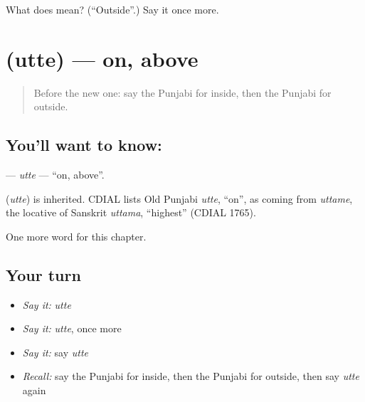 \begin{tcolorbox}[breakable,colback=teal!4,colframe=teal!35!black,title={Before you move on}]
What does  mean? (\textquotedblleft{}Outside\textquotedblright{}.) Say it once more.
\end{tcolorbox}
\section[\texorpdfstring{\pa{ਉੱਤੇ} (utte)}{ਉੱਤੇ (utte)}]{ (utte) — on, above}

\label{lesson:PA-C88-utte}



\begin{quote}
Before the new one: say the Punjabi for inside, then the Punjabi for outside.
\end{quote}

\subsection*{You'll want to know: }
\textbf{} — \emph{utte} — \textquotedblleft{}on, above\textquotedblright{}.

\begin{cousinweb}
\textbf{} (\emph{utte}) is inherited. CDIAL lists Old Punjabi \emph{utte}, \textquotedblleft{}on\textquotedblright{}, as coming from \emph{uttame}, the locative of Sanskrit \emph{uttama}, \textquotedblleft{}highest\textquotedblright{} (CDIAL 1765).
\end{cousinweb}

\begin{grammarlens}[title={What you've built}]
One more word for this chapter.
\end{grammarlens}

\subsection*{Your turn}
\begin{itemize}
\raggedright
  \item \emph{Say it:} \emph{utte}
  \item \emph{Say it:} \emph{utte}, once more
  \item \emph{Say it:} say \emph{utte}
  \item \emph{Recall:} say the Punjabi for inside, then the Punjabi for outside, then say \emph{utte} again
\end{itemize}

